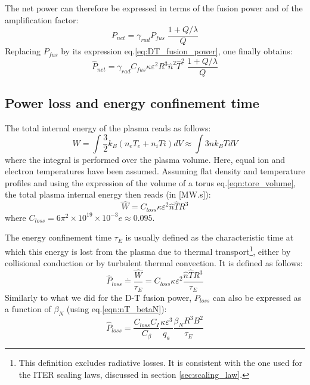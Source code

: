 The net power can therefore be expressed in terms of the fusion power and of the amplification factor:
\begin{equation}
\boxed{
P_{net} = \gamma_{rad} P_{fus} \; \frac{1+Q/\lambda}{Q}
}
\label{eq:Pnet_PDT_Q}
\end{equation}
Replacing $P_{fus}$ by its expression eq.\ref{eq:DT_fusion_power}, one finally obtains:
\begin{equation}
  \hat P_{net} = \gamma_{rad} C_{fus} \kappa \varepsilon^2 R^3 \hat n^2 \hat T^2 \; \frac{1+Q/\lambda}{Q}
\label{eq:Pnet_QnTR}
\end{equation}


\subsection{Power loss and energy confinement time}

The total internal energy of the plasma reads as follows:
\begin{equation*}
  W  = \int \frac{3}{2} k_B \left( n_e T_e + n_i Ti \right ) dV 
  \approx \int 3 n k_BT dV
\end{equation*}
where the integral is performed over the plasma volume. Here, equal ion and electron temperatures have been assumed. Assuming flat density and temperature profiles and using the expression of the volume of a torus eq.\ref{eqn:tore_volume}, the total plasma internal energy then reads (in [MW.s]):
\begin{equation}
  \hat W = C_{loss} \kappa \varepsilon^2  \hat n \hat T R^3
\label{eq:total_energy}
\end{equation}
where $C_{loss} = 6\pi^2 \times 10^{19} \times 10^{-3}e \approx 0.095$.

The energy confinement time $\tau_E$ is usually defined as the characteristic time at which this energy is lost from the plasma due to thermal transport\footnote{This definition excludes radiative losses. It is consistent with the one used for the ITER scaling laws, discussed in section \ref{sec:scaling_law}.}, either by collisional conduction or by turbulent thermal convection. It is defined as follows:
\begin{equation}
\boxed{
  \hat P_{loss} \doteq \frac{\hat W}{\tau_E} 
  = C_{loss} \kappa \varepsilon^2  \frac{\hat n \hat T R^3}{\tau_E}
}
\label{eq:Ploss}
\end{equation}
Similarly to what we did for the D-T fusion power, $P_{loss}$ can also be expressed as a function of $\beta_N$ (using eq.\ref{eqn:nT_betaN}):
\begin{equation}
  \hat P_{loss} = \frac{C_{loss}C_I}{C_\beta}  \frac{\kappa \varepsilon^3}{q_a}
    \frac{\beta_N R^3 B^2}{\tau_E}
\label{eq:Ploss_betaN}
\end{equation}



